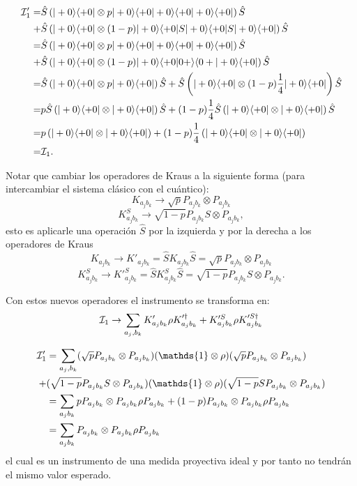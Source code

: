 \documentclass[12pt,oneside]{book}\raggedbottom{}
\begin{document}
\[\begin{split}
	\mathcal{I}'_1=&\hat{S}\left(|+0\rangle \langle+0| \otimes p |+0\rangle \langle+0| +0\rangle \langle+0|+0\rangle \langle+0|\right)\hat{S}\\
	+&\hat{S}\left(|+0\rangle \langle+0| \otimes (1-p) |+0\rangle \langle+0|S|+0\rangle \langle+0| S  |+0\rangle \langle+0|\right)\hat{S}\\
	=&\hat{S}\left(|+0\rangle \langle+0| \otimes p |+0\rangle \langle+0| +0\rangle \langle+0|+0\rangle \langle+0|\right)\hat{S}\\
	+&\hat{S}\left(|+0\rangle \langle+0| \otimes (1-p) |+0\rangle \langle+0|0+\rangle \langle0+|+0\rangle \langle+0|\right)\hat{S}\\
	=&\hat{S}\left(|+0\rangle \langle+0| \otimes p |+0\rangle \langle+0|\right)\hat{S}+\hat{S}\left(|+0\rangle \langle+0| \otimes (1-p) \frac{1}{4}|+0\rangle \langle+0|\right)\hat{S}\\	
	=&p\hat{S}\left(|+0\rangle \langle+0| \otimes |+0\rangle \langle+0|\right)\hat{S} +(1-p) \frac{1}{4}\hat{S}\left(|+0\rangle \langle+0| \otimes |+0\rangle \langle+0|\right)\hat{S}\\	
	=&p\left(|+0\rangle \langle+0| \otimes |+0\rangle \langle+0|\right)+(1-p) \frac{1}{4}\left(|+0\rangle \langle+0| \otimes |+0\rangle \langle+0|\right)\\	
	=&\mathcal{I}_1.\\
\end{split}\]




Notar que cambiar los operadores de Kraus a la siguiente forma (para intercambiar el sistema clásico con el cuántico):\[K_{a_j b_k}\to \sqrt{p}P_{a_j b_k}\otimes P_{a_j b_k}\]
\[K^S_{a_j b_k}\to \sqrt{1-p}P_{a_j b_k}S\otimes P_{a_j b_k},\] esto es aplicarle una operación $\hat{S}$ por la izquierda y por la derecha a los operadores de Kraus \[K_{a_j b_k}\to K'_{a_j b_k}=\hat{S}K_{a_j b_k}\hat{S}= \sqrt{p}P_{a_j b_k}\otimes P_{a_j b_k}\]
\[K^S_{a_j b_k}\to K'^S_{a_j b_k}=\hat{S}K_{a_j b_k}^S\hat{S}=\sqrt{1-p}P_{a_j b_k}S\otimes P_{a_j b_k}.\]

Con estos nuevos operadores el instrumento se transforma en:\[\mathcal{I}_1\to \sum_{a_j, b_k}K'_{a_j b_k}\rho K'^\dagger_{a_j b_k}+K'^S_{a_j b_k}\rho K'^{S\dagger}_{a_j b_k} \]

\[\begin{split} \I_1'&= \sum_{a_j, b_k}(\sqrt{p}P_{a_j b_k}\otimes P_{a_j b_k})(\mathds{1}\otimes \rho)(\sqrt{p}P_{a_j b_k}\otimes P_{a_j b_k})\\
	+&(\sqrt{1-p}P_{a_j b_k}S\otimes P_{a_j b_k})(\mathds{1}\otimes \rho) (\sqrt{1-p}SP_{a_j b_k} \otimes P_{a_j b_k})\\
	&=\sum_{a_j b_k} pP_{a_j b_k}\otimes P_{a_j b_k}\rho P_{a_j b_k}+ (1-p) P_{a_j b_k}\otimes P_{a_j b_k}\rho P_{a_j b_k}\\
	&=\sum_{a_j b_k} P_{a_j b_k}\otimes P_{a_j b_k}\rho P_{a_j b_k}
\end{split}\] el cual es un instrumento de una medida proyectiva ideal y por tanto no tendrán el mismo valor esperado.








\vspace{0.1 in}
\end{document}
